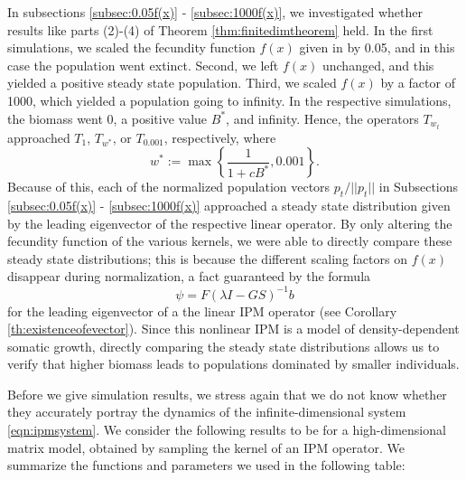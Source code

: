 In subsections \ref{subsec:0.05f(x)} - \ref{subsec:1000f(x)}, we investigated whether results like parts (2)-(4) of Theorem \ref{thm:finitedimtheorem} held. In the first simulations, we scaled the fecundity function $f(x)$ given in \cite{Vindenes2014} by 0.05, and in this case the population went extinct. Second, we left $f(x)$ unchanged, and this yielded a positive steady state population. Third, we scaled $f(x)$ by  a factor of 1000, which yielded a population going to infinity. In the respective simulations, the biomass went 0, a positive value $B^*$, and infinity. Hence, the operators $T_{w_t}$ approached $T_1$, $T_{w^*}$, or $T_{0.001}$, respectively, where
\[w^*:= \max \left\{ \frac{1}{1 + c B^*}, 0.001 \right\}.\]
Because of this, each of the normalized population vectors $p_t/||p_t||$ in Subsections \ref{subsec:0.05f(x)} - \ref{subsec:1000f(x)} approached a steady state distribution given by the leading eigenvector of the respective linear operator. By only altering the fecundity function of the various kernels, we were able to directly compare these steady state distributions; this is because the different scaling factors on $f(x)$ disappear during  normalization, a fact guaranteed by the formula 
\[\psi = F(\lambda I - GS)^{-1}b\]
for the leading eigenvector of a the linear IPM operator (see Corollary \ref{th:existenceofevector}). Since this nonlinear IPM is a model of density-dependent somatic growth, directly comparing the steady state distributions allows us to verify that higher biomass leads to populations dominated by smaller individuals.

Before we give simulation results, we stress again that we do not know whether they accurately portray the dynamics of the infinite-dimensional system \ref{eqn:ipmsystem}. We consider the following results to be for a high-dimensional matrix model, obtained by sampling the kernel of an IPM operator. We summarize the functions and parameters we used in the following table:

